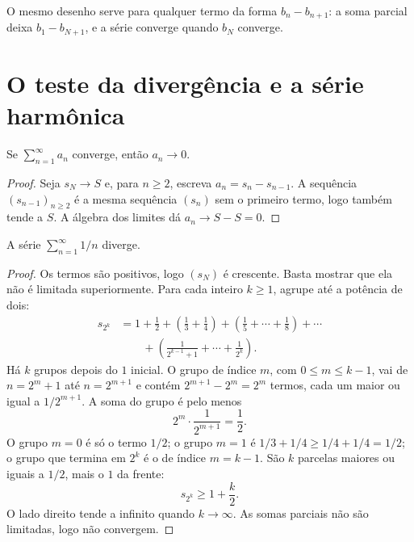 \documentclass[11pt,a4paper]{article}
\begin{document}
O mesmo desenho serve para qualquer termo da forma \(b_n-b_{n+1}\): a soma parcial deixa \(b_1-b_{N+1}\), e a série converge quando \(b_N\) converge.

\section{O teste da divergência e a série harmônica}

\begin{teorema}
Se \(\sum_{n=1}^\infty a_n\) converge, então \(a_n\to 0\).
\end{teorema}

\begin{proof}
Seja \(s_N\to S\) e, para \(n\ge 2\), escreva \(a_n=s_n-s_{n-1}\). A sequência \((s_{n-1})_{n\ge 2}\) é a mesma sequência \((s_n)\) sem o primeiro termo, logo também tende a \(S\). A álgebra dos limites dá \(a_n\to S-S=0\).
\end{proof}


\begin{teorema}
A série \(\sum_{n=1}^\infty 1/n\) diverge.
\end{teorema}

\begin{proof}
Os termos são positivos, logo \((s_N)\) é crescente. Basta mostrar que ela não é limitada superiormente. Para cada inteiro \(k\ge 1\), agrupe até a potência de dois:
\begin{align*}
s_{2^k}
&=1+\frac{1}{2}+\left(\frac{1}{3}+\frac{1}{4}\right)+\left(\frac{1}{5}+\cdots+\frac{1}{8}\right)+\cdots\\
&\qquad+\left(\frac{1}{2^{k-1}+1}+\cdots+\frac{1}{2^k}\right).
\end{align*}
Há \(k\) grupos depois do \(1\) inicial. O grupo de índice \(m\), com \(0\le m\le k-1\), vai de \(n=2^m+1\) até \(n=2^{m+1}\) e contém \(2^{m+1}-2^m=2^m\) termos, cada um maior ou igual a \(1/2^{m+1}\). A soma do grupo é pelo menos
\[
2^m\cdot\frac{1}{2^{m+1}}=\frac{1}{2}.
\]
O grupo \(m=0\) é só o termo \(1/2\); o grupo \(m=1\) é \(1/3+1/4\ge 1/4+1/4=1/2\); o grupo que termina em \(2^k\) é o de índice \(m=k-1\). São \(k\) parcelas maiores ou iguais a \(1/2\), mais o \(1\) da frente:
\[
s_{2^k}\ge 1+\frac{k}{2}.
\]
O lado direito tende a infinito quando \(k\to\infty\). As somas parciais não são limitadas, logo não convergem.
\end{proof}
\end{document}
